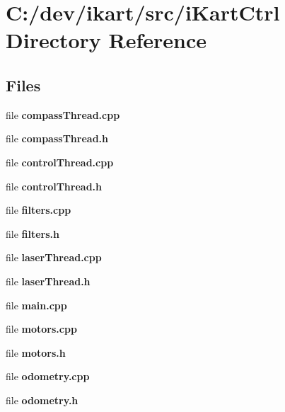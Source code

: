 \section{C\+:/dev/ikart/src/i\+Kart\+Ctrl Directory Reference}
\label{dir_c1c9f02a4bf2261e5e62d7b9847944b2}
\subsection*{Files}
\begin{DoxyCompactItemize}
\item 
file {\bfseries compass\+Thread.\+cpp}
\item 
file {\bfseries compass\+Thread.\+h}
\item 
file {\bfseries control\+Thread.\+cpp}
\item 
file {\bfseries control\+Thread.\+h}
\item 
file {\bfseries filters.\+cpp}
\item 
file {\bfseries filters.\+h}
\item 
file {\bfseries laser\+Thread.\+cpp}
\item 
file {\bfseries laser\+Thread.\+h}
\item 
file {\bfseries main.\+cpp}
\item 
file {\bfseries motors.\+cpp}
\item 
file {\bfseries motors.\+h}
\item 
file {\bfseries odometry.\+cpp}
\item 
file {\bfseries odometry.\+h}
\end{DoxyCompactItemize}
